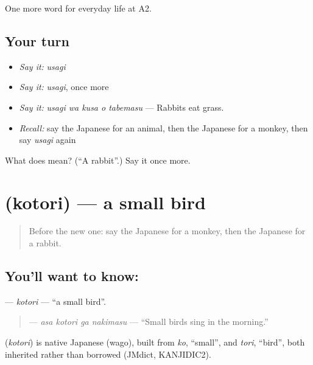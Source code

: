 \begin{grammarlens}[title={What you've built}]
One more word for everyday life at A2.
\end{grammarlens}

\subsection*{Your turn}
\begin{itemize}
\raggedright
  \item \emph{Say it:} \emph{usagi}
  \item \emph{Say it:} \emph{usagi}, once more
  \item \emph{Say it:} \emph{usagi wa kusa o tabemasu} — Rabbits eat grass.
  \item \emph{Recall:} say the Japanese for an animal, then the Japanese for a monkey, then say \emph{usagi} again
\end{itemize}

\begin{tcolorbox}[breakable,colback=teal!4,colframe=teal!35!black,title={Before you move on}]
What does  mean? (\textquotedblleft{}A rabbit\textquotedblright{}.) Say it once more.
\end{tcolorbox}
\section[\texorpdfstring{\ja{ことり} (kotori)}{ことり (kotori)}]{ (kotori) — a small bird}

\label{lesson:JA-C211-kotori}



\begin{quote}
Before the new one: say the Japanese for a monkey, then the Japanese for a rabbit.
\end{quote}

\subsection*{You'll want to know: }
\textbf{} — \emph{kotori} — \textquotedblleft{}a small bird\textquotedblright{}.

\begin{quote}
\textbf{  } — \emph{asa kotori ga nakimasu} — \textquotedblleft{}Small birds sing in the morning.\textquotedblright{}
\end{quote}

\begin{cousinweb}
\textbf{} (\emph{kotori}) is native Japanese (wago), built from \emph{ko}, \textquotedblleft{}small\textquotedblright{}, and \emph{tori}, \textquotedblleft{}bird\textquotedblright{}, both inherited rather than borrowed (JMdict, KANJIDIC2).
\end{cousinweb}

